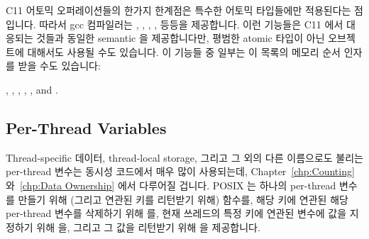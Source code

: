 C11 어토믹 오퍼레이션들의 한가지 한계점은 특수한 어토믹 타입들에만 적용된다는
점입니다.
따라서 gcc 컴파일러는
,
,
,
, 등등을 제공합니다.
이런 기능들은 C11 에서 대응되는 것들과 동일한 semantic 을 제공합니다만, 평범한
atomic 타입이 아닌 오브젝트에 대해서도 사용될 수도 있습니다.
이 기능들 중 일부는 이 목록의 메모리 순서 인자를 받을 수도 있습니다:

{},
,
,
,
, and
.
\fi

\subsection{Per-Thread Variables}
\label{sec:toolsoftrade:Per-Thread Variables}

Thread-specific 데이터, thread-local storage, 그리고 그 외의 다른 이름으로도
불리는 per-thread 변수는 동시성 코드에서 매우 많이 사용되는데,
Chapter~\ref{chp:Counting} 와~\ref{chp:Data Ownership} 에서 다루어질 겁니다.
POSIX 는 하나의 per-thread 변수를 만들기 위해 (그리고 연관된 키를 리턴받기
위해)  함수를, 해당 키에 연관된 해당 per-thread 변수를
삭제하기 위해  를, 현재 쓰레드의 특정 키에 연관된
변수에 값을 지정하기 위해  을, 그리고 그 값을
리턴받기 위해  을 제공합니다.

